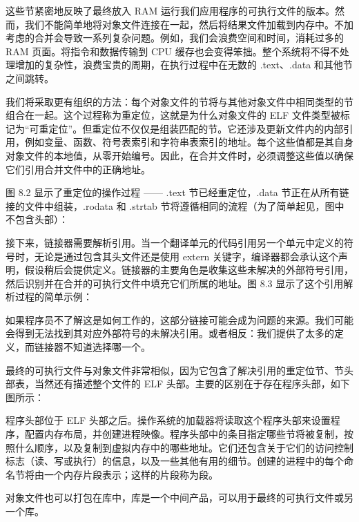 这些节紧密地反映了最终放入 RAM 运行我们应用程序的可执行文件的版本。然而，我们不能简单地将对象文件连接在一起，然后将结果文件加载到内存中。不加考虑的合并会导致一系列复杂问题。例如，我们会浪费空间和时间，消耗过多的 RAM 页面。将指令和数据传输到 CPU 缓存也会变得笨拙。整个系统将不得不处理增加的复杂性，浪费宝贵的周期，在执行过程中在无数的 .text、.data 和其他节之间跳转。

我们将采取更有组织的方法：每个对象文件的节将与其他对象文件中相同类型的节组合在一起。这个过程称为重定位，这就是为什么对象文件的 ELF 文件类型被标记为“可重定位”。但重定位不仅仅是组装匹配的节。它还涉及更新文件内的内部引用，例如变量、函数、符号表索引和字符串表索引的地址。每个这些值都是其自身对象文件的本地值，从零开始编号。因此，在合并文件时，必须调整这些值以确保它们引用合并文件中的正确地址。

图 8.2 显示了重定位的操作过程 —— .text 节已经重定位，.data 节正在从所有链接的文件中组装，.rodata 和 .strtab 节将遵循相同的流程（为了简单起见，图中不包含头部）：


接下来，链接器需要解析引用。当一个翻译单元的代码引用另一个单元中定义的符号时，无论是通过包含其头文件还是使用 extern 关键字，编译器都会承认这个声明，假设稍后会提供定义。链接器的主要角色是收集这些未解决的外部符号引用，然后识别并在合并的可执行文件中填充它们所属的地址。图 8.3 显示了这个引用解析过程的简单示例：


如果程序员不了解这是如何工作的，这部分链接可能会成为问题的来源。我们可能会得到无法找到其对应外部符号的未解决引用。或者相反：我们提供了太多的定义，而链接器不知道选择哪一个。

最终的可执行文件与对象文件非常相似，因为它包含了解决引用的重定位节、节头部表，当然还有描述整个文件的 ELF 头部。主要的区别在于存在程序头部，如下图所示：


程序头部位于 ELF 头部之后。操作系统的加载器将读取这个程序头部来设置程序，配置内存布局，并创建进程映像。程序头部中的条目指定哪些节将被复制，按照什么顺序，以及复制到虚拟内存中的哪些地址。它们还包含关于它们的访问控制标志（读、写或执行）的信息，以及一些其他有用的细节。创建的进程中的每个命名节将由一个内存片段表示；这样的片段称为段。

对象文件也可以打包在库中，库是一个中间产品，可以用于最终的可执行文件或另一个库。

